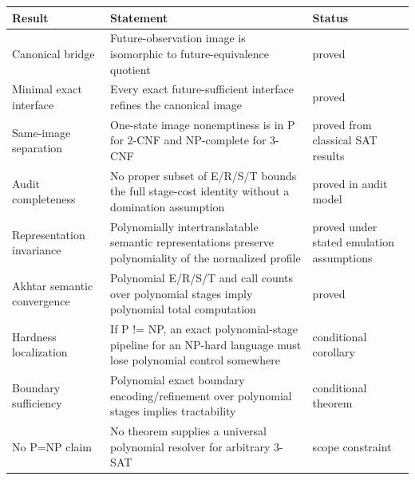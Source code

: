 \begin{tabularx}{\textwidth}{lXl}
\toprule
Result & Statement & Status \\
\midrule
Canonical bridge & Future-observation image is isomorphic to future-equivalence quotient & proved \\
Minimal exact interface & Every exact future-sufficient interface refines the canonical image & proved \\
Same-image separation & One-state image nonemptiness is in P for 2-CNF and NP-complete for 3-CNF & proved from classical SAT results \\
Audit completeness & No proper subset of E/R/S/T bounds the full stage-cost identity without a domination assumption & proved in audit model \\
Representation invariance & Polynomially intertranslatable semantic representations preserve polynomiality of the normalized profile & proved under stated emulation assumptions \\
Akhtar semantic convergence & Polynomial E/R/S/T and call counts over polynomial stages imply polynomial total computation & proved \\
Hardness localization & If P != NP, an exact polynomial-stage pipeline for an NP-hard language must lose polynomial control somewhere & conditional corollary \\
Boundary sufficiency & Polynomial exact boundary encoding/refinement over polynomial stages implies tractability & conditional theorem \\
No P=NP claim & No theorem supplies a universal polynomial resolver for arbitrary 3-SAT & scope constraint \\
\bottomrule
\end{tabularx}
